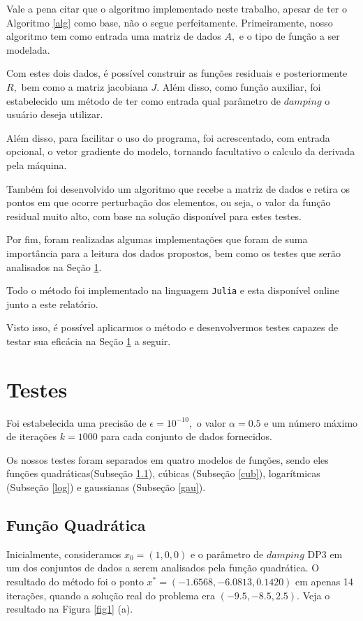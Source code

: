 \documentclass[12pt,a4paper]{article}
\newcounter{ex}[section]
\begin{document}
	 Vale a pena citar que o algoritmo implementado neste trabalho, apesar de ter o Algoritmo \ref{alg} como base, não o segue perfeitamente. Primeiramente, nosso algoritmo tem como entrada uma matriz de dados $A,$ e o tipo de função a ser modelada.
	 
	 Com estes dois dados, é possível construir as funções residuais e posteriormente $R,$ bem como a matriz jacobiana $J.$ Além disso, como função auxiliar, foi estabelecido um método de ter como entrada qual parâmetro de $damping$ o usuário deseja utilizar.
	 
 	Além disso, para facilitar o uso do programa, foi acrescentado, com entrada opcional, o vetor gradiente do modelo, tornando facultativo o calculo da derivada pela máquina.
 	
 	Também foi desenvolvido um algoritmo que recebe a matriz de dados e retira os pontos em que ocorre perturbação dos elementos, ou seja, o valor da função residual muito alto, com base na solução disponível para estes testes.
	 	
	 Por fim, foram realizadas algumas implementações que foram de suma importância para a leitura dos dados propostos, bem como os testes que serão analisados na Seção \ref{testes}.
	 
	 Todo o método foi implementado na linguagem \texttt{Julia} e esta disponível online junto a este relatório. 

	Visto isso, é possível aplicarmos o método e desenvolvermos testes capazes de testar sua eficácia na Seção \ref{testes} a seguir.
	
	\section{Testes}\label{testes}
	
	Foi estabelecida uma precisão de $\epsilon = 10^{-10},$ o valor $\alpha = 0.5$ e um número máximo de iterações $k=1000$ para cada conjunto de dados fornecidos.
	
	Os nossos testes foram separados em quatro modelos de funções, sendo eles funções quadráticas(Subseção \ref{quad}), cúbicas (Subseção \ref{cub}), logarítmicas (Subseção \ref{log}) e gaussianas (Subseção \ref{gau}).
	
	\subsection{Função Quadrática}\label{quad}
	Inicialmente, consideramos $x_0 = (1, 0, 0)$ e o parâmetro de $damping$ DP3 em um dos conjuntos de dados a serem analisados pela função quadrática. O resultado do método foi o ponto $x^* = (-1.6568, -6.0813, 0.1420)$ em apenas 14 iterações, quando a solução real do problema era $(-9.5, -8.5, 2.5).$ Veja o resultado na Figura \ref{fig1} (a).
	
\end{document}

